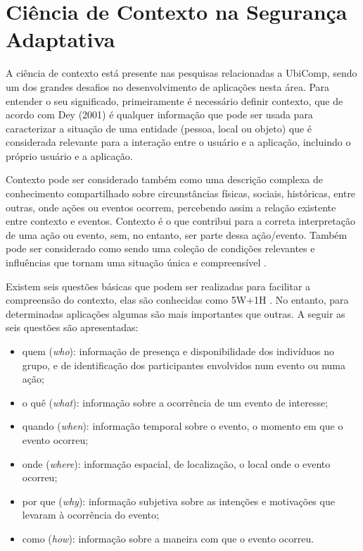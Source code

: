 \documentclass[tid,table]{texufpel} %
\begin{document}
\section{Ciência de Contexto na Segurança Adaptativa}

A ciência de contexto está presente nas pesquisas relacionadas a UbiComp, sendo um dos grandes desafios no desenvolvimento de aplicações nesta área.  Para entender o seu significado, primeiramente é necessário definir contexto, que de acordo com Dey (2001)\nocite{dey01} é qualquer informação que pode ser usada para caracterizar a situação de uma entidade (pessoa, local ou objeto) que é considerada relevante para a interação entre o usuário e a aplicação, incluindo o próprio usuário e a aplicação.

Contexto pode ser considerado também como uma descrição complexa de conhecimento compartilhado sobre circunstâncias físicas, sociais, históricas, entre outras, onde ações ou eventos ocorrem, percebendo assim a relação existente entre contexto e eventos. Contexto é o que contribui para a correta interpretação de uma ação ou evento, sem, no entanto, ser parte dessa ação/evento. Também pode ser considerado como sendo uma coleção de condições relevantes e influências que tornam uma situação única e compreensível \cite{brezillon99, li15}.

Existem seis questões básicas que podem ser realizadas para facilitar a compreensão do contexto, elas são conhecidas como 5W+1H \cite{vieira04}. No entanto, para determinadas aplicações algumas são mais importantes que outras. A seguir as seis questões são apresentadas:


\begin{itemize}

\item quem (\textit{who}): informação de presença e disponibilidade dos indivíduos no grupo, e de identificação dos participantes envolvidos num evento ou numa ação;

\item o quê (\textit{what}): informação sobre a ocorrência de um evento de interesse;

\item quando (\textit{when}): informação temporal sobre o evento, o momento em que o evento ocorreu;

\item onde (\textit{where}): informação espacial, de localização, o local onde o evento ocorreu;

\item por que (\textit{why}): informação subjetiva sobre as intenções e motivações que levaram à ocorrência do evento;

\item como (\textit{how}): informação sobre a maneira com que o evento ocorreu.

\end{itemize}
\end{document}

